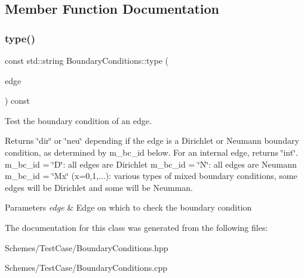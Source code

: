 \subsection{Member Function Documentation}
\mbox{\label{classBoundaryConditions_abaeb77c2484042f248639f1806fe8e72}} 
\subsubsection{\texorpdfstring{type()}{type()}}
{\footnotesize\ttfamily const std\+::string Boundary\+Conditions\+::type (\begin{DoxyParamCaption}\item[{const \hyperlink{classHArDCore2D_1_1Edge}{Edge} \&}]{edge }\end{DoxyParamCaption}) const}



Test the boundary condition of an edge. 

\begin{DoxyReturn}{Returns}
\char`\"{}dir\char`\"{} or \char`\"{}neu\char`\"{} depending if the edge is a Dirichlet or Neumann boundary condition, as determined by m\+\_\+bc\+\_\+id below. For an internal edge, returns \char`\"{}int\char`\"{}. m\+\_\+bc\+\_\+id = \char`\"{}\+D\char`\"{}\+: all edges are Dirichlet m\+\_\+bc\+\_\+id = \char`\"{}\+N\char`\"{}\+: all edges are Neumann m\+\_\+bc\+\_\+id = \char`\"{}\+Mx\char`\"{} (x=0,1,...)\+: various types of mixed boundary conditions, some edges will be Dirichlet and some will be Neumman. 
\end{DoxyReturn}

\begin{DoxyParams}{Parameters}
{\em edge} & Edge on which to check the boundary condition \\
\hline
\end{DoxyParams}


The documentation for this class was generated from the following files\+:\begin{DoxyCompactItemize}
\item 
Schemes/\+Test\+Case/Boundary\+Conditions.\+hpp\item 
Schemes/\+Test\+Case/Boundary\+Conditions.\+cpp\end{DoxyCompactItemize}
